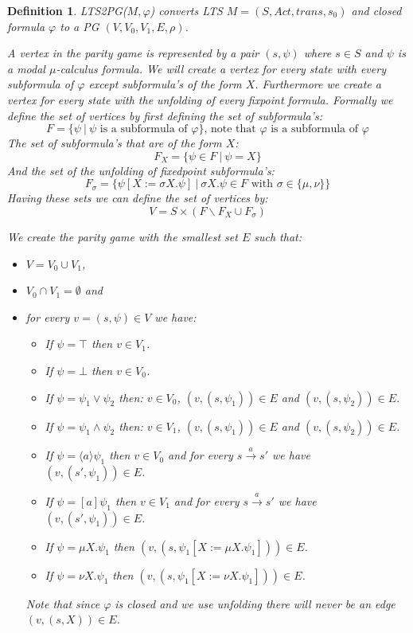 \documentclass[]{article}
\newtheorem{definition}{Definition}[section]
\begin{document}
\begin{definition}
	\label{def_LTS2PG}\cite{Bradfield2018}
	LTS2PG($M, \varphi$) converts LTS $M = (S, Act, trans, s_0)$ and closed formula $\varphi$ to a PG $(V, V_0, V_1, E, \rho)$.
	
	A vertex in the parity game is represented by a pair $(s, \psi)$ where $s \in S$ and $\psi$ is a modal $\mu$-calculus formula. We will create a vertex for every state with every subformula of $\varphi$ except subformula's of the form $X$. Furthermore we create a vertex for every state with the unfolding of every fixpoint formula. Formally we define the set of vertices by first defining the set of subformula's:
	\[ F = \{ \psi\ |\ \psi \text{ is a subformula of } \varphi \} \text{, note that $\varphi$ is a subformula of $\varphi$} \]
	The set of subformula's that are of the form $X$:
	\[ F_X = \{ \psi \in F\ |\ \psi = X\} \]
	 And the set of the unfolding of fixedpoint subformula's:
	 \[ F_\sigma = \{\psi[X:=\sigma X. \psi]\ |\ \sigma X. \psi \in F \text{ with } \sigma \in \{\mu, \nu\}\} \]
	Having these sets we can define the set of vertices by:
	\[ V = S \times (F \backslash F_X \cup F_{\sigma})\]
	
	We create the parity game with the smallest set $E$ such that:
	\begin{itemize}
		\item $V = V_0 \cup V_1$,
		\item $V_0 \cap V_1 = \emptyset$ and
		\item for every $v = (s, \psi) \in V$ we have:
		\begin{itemize}
			\item If $\psi = \top$ then $v \in V_1$.
			\item If $\psi = \bot$ then $v \in V_0$.
			\item If $\psi = \psi_1 \vee \psi_2$ then:
				\subitem $v \in V_0$,
				\subitem $(v, (s,\psi_1)) \in E$ and
				\subitem $(v, (s,\psi_2)) \in E$.
			\item If $\psi = \psi_1 \wedge \psi_2$ then:
				\subitem $v \in V_1$,
				\subitem $(v, (s,\psi_1)) \in E$ and
				\subitem $(v, (s,\psi_2)) \in E$.
			\item If $\psi = \langle a \rangle \psi_1$ then $v \in V_0$ and for every $s \xrightarrow{ a} s'$ we have $(v, (s', \psi_1)) \in E$.
			\item If $\psi = [ a ] \psi_1$ then $v \in V_1$ and for every $s \xrightarrow{ a} s'$ we have  $(v, (s', \psi_1)) \in E$.
			\item If $\psi = \mu X. \psi_1$ then $(v, (s, \psi_1[X:=\mu X. \psi_1])) \in E$.
			\item If $\psi = \nu X. \psi_1$ then $(v, (s, \psi_1[X:=\nu X. \psi_1])) \in E$.
		\end{itemize}
	Note that since $\varphi$ is closed and we use unfolding there will never be an edge $(v,(s, X)) \in E$.
	\end{itemize}



\end{definition}
\end{document}
